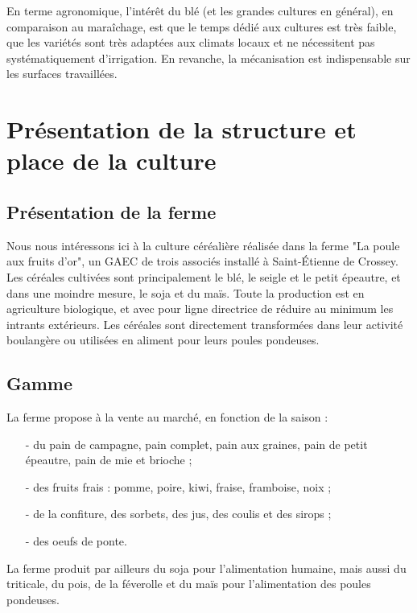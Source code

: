\documentclass{article}
\begin{document}
En terme agronomique, l'intérêt du blé (et les grandes cultures en général), en comparaison au maraîchage, est que le temps dédié aux cultures est très faible, que les variétés sont très adaptées aux climats locaux et ne nécessitent pas systématiquement d'irrigation. En revanche, la mécanisation est indispensable sur les surfaces travaillées. 

\section{Présentation de la structure et place de la culture}

\subsection{Présentation de la ferme}

Nous nous intéressons ici à la culture céréalière réalisée dans la ferme "La poule aux fruits d'or", un GAEC de trois associés installé à Saint-Étienne de Crossey. Les céréales cultivées sont principalement le blé, le seigle et le petit épeautre, et dans une moindre mesure, le soja et du maïs. Toute la production est en agriculture biologique, et avec pour ligne directrice de réduire au minimum les intrants extérieurs. Les céréales sont directement transformées dans leur activité boulangère ou utilisées en aliment pour leurs poules pondeuses.

\subsection{Gamme}

La ferme propose à la vente au marché, en fonction de la saison :
\begin{itemize}
	\item[-] du pain de campagne, pain complet, pain aux graines, pain de petit épeautre, pain de mie et brioche ;
	\item[-] des fruits frais : pomme, poire, kiwi, fraise, framboise, noix ;
	\item[-] de la confiture, des sorbets, des jus, des coulis et des sirops ;
	\item[-] des oeufs de ponte.
\end{itemize}

La ferme produit par ailleurs du soja pour l'alimentation humaine, mais aussi du triticale, du pois, de la féverolle et du maïs pour l'alimentation des poules pondeuses.
\end{document}
